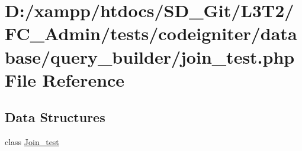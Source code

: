 \hypertarget{_admin_2tests_2codeigniter_2database_2query__builder_2join__test_8php}{}\section{D\+:/xampp/htdocs/\+S\+D\+\_\+\+Git/\+L3\+T2/\+F\+C\+\_\+\+Admin/tests/codeigniter/database/query\+\_\+builder/join\+\_\+test.php File Reference}
\label{_admin_2tests_2codeigniter_2database_2query__builder_2join__test_8php}
\subsection*{Data Structures}
\begin{DoxyCompactItemize}
\item 
class \hyperlink{class_join__test}{Join\+\_\+test}
\end{DoxyCompactItemize}
